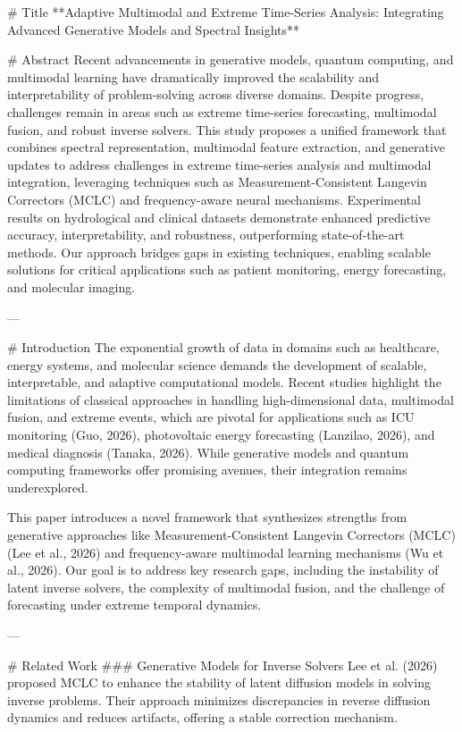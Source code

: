 # Title
**Adaptive Multimodal and Extreme Time-Series Analysis: Integrating Advanced Generative Models and Spectral Insights**

# Abstract
Recent advancements in generative models, quantum computing, and multimodal learning have dramatically improved the scalability and interpretability of problem-solving across diverse domains. Despite progress, challenges remain in areas such as extreme time-series forecasting, multimodal fusion, and robust inverse solvers. This study proposes a unified framework that combines spectral representation, multimodal feature extraction, and generative updates to address challenges in extreme time-series analysis and multimodal integration, leveraging techniques such as Measurement-Consistent Langevin Correctors (MCLC) and frequency-aware neural mechanisms. Experimental results on hydrological and clinical datasets demonstrate enhanced predictive accuracy, interpretability, and robustness, outperforming state-of-the-art methods. Our approach bridges gaps in existing techniques, enabling scalable solutions for critical applications such as patient monitoring, energy forecasting, and molecular imaging.

---

# Introduction
The exponential growth of data in domains such as healthcare, energy systems, and molecular science demands the development of scalable, interpretable, and adaptive computational models. Recent studies highlight the limitations of classical approaches in handling high-dimensional data, multimodal fusion, and extreme events, which are pivotal for applications such as ICU monitoring (Guo, 2026), photovoltaic energy forecasting (Lanzilao, 2026), and medical diagnosis (Tanaka, 2026). While generative models and quantum computing frameworks offer promising avenues, their integration remains underexplored.

This paper introduces a novel framework that synthesizes strengths from generative approaches like Measurement-Consistent Langevin Correctors (MCLC) (Lee et al., 2026) and frequency-aware multimodal learning mechanisms (Wu et al., 2026). Our goal is to address key research gaps, including the instability of latent inverse solvers, the complexity of multimodal fusion, and the challenge of forecasting under extreme temporal dynamics. 

---

# Related Work
### Generative Models for Inverse Solvers
Lee et al. (2026) proposed MCLC to enhance the stability of latent diffusion models in solving inverse problems. Their approach minimizes discrepancies in reverse diffusion dynamics and reduces artifacts, offering a stable correction mechanism.

